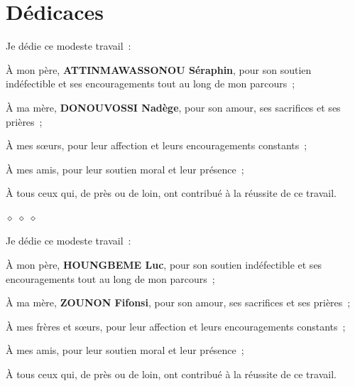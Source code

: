 \chapter*{D\'edicaces}

Je d\'edie ce modeste travail~:

\`A mon p\`ere, \textbf{ATTINMAWASSONOU S\'eraphin}, pour son soutien ind\'efectible et ses
encouragements tout au long de mon parcours~;

\`A ma m\`ere, \textbf{DONOUVOSSI Nad\`ege}, pour son amour, ses sacrifices et
ses pri\`eres~;

\`A mes s\oe urs, pour leur affection et leurs
encouragements constants~;

\`A mes amis, pour leur soutien moral et leur pr\'esence~;

\`A tous ceux qui, de pr\`es ou de loin, ont contribu\'e \`a la r\'eussite de
ce travail.

\vspace{0.5cm}
\begin{center}
  $\diamond$ $\diamond$ $\diamond$
\end{center}
\vspace{0.5cm}

Je d\'edie ce modeste travail~:

\`A mon p\`ere, \textbf{HOUNGBEME Luc}, pour son soutien ind\'efectible et ses
encouragements tout au long de mon parcours~;

\`A ma m\`ere, \textbf{ZOUNON Fifonsi}, pour son amour, ses sacrifices et
ses pri\`eres~;

\`A mes fr\`eres et s\oe urs, pour leur affection et leurs
encouragements constants~;

\`A mes amis, pour leur soutien moral et leur pr\'esence~;

\`A tous ceux qui, de pr\`es ou de loin, ont contribu\'e \`a la r\'eussite de
ce travail.